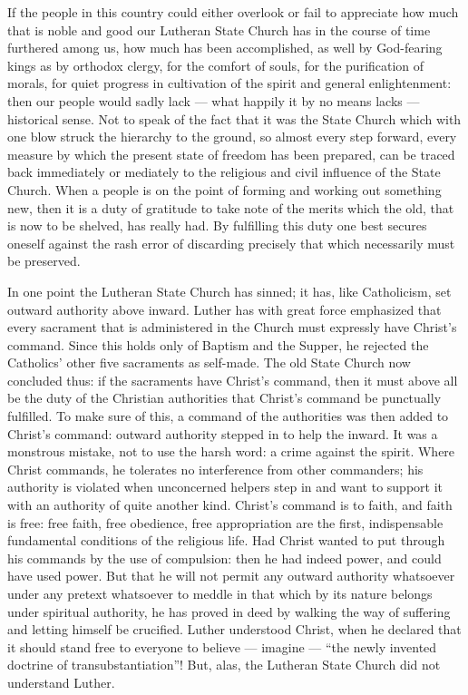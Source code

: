 \documentclass[12pt,a4paper,openany]{book}
\newcommand{\opage}[1]{\marginnote{\footnotesize\textit{[#1]}}}
\begin{document}
If the people in this country could either overlook
or fail to appreciate how much that is noble and good our Lutheran
State Church has in the course of time furthered among us, how
much has been accomplished, as well by God-fearing kings as by orthodox
clergy, for the comfort of souls,
for the purification of morals, for quiet progress in cultivation of the spirit
and general enlightenment: then our people would
sadly lack --- what happily it by no means
lacks --- historical sense. Not to speak of
the fact that it was the State Church which with one blow struck the
\setcounter{footnote}{0}%
\opage{80}hierarchy to the ground, so almost every step
forward, every measure by which the present
state of freedom has been prepared, can be traced back immediately or
mediately to the religious and civil influence of the State Church.
When a people is on the point of forming and working out something new, then it is a
duty of gratitude to take note of the merits
which the old, that is now to be shelved, has really
had. By fulfilling this duty one best secures oneself
against the rash error of discarding precisely that
which necessarily must be preserved.

In one point the Lutheran State Church has sinned;
it has, like Catholicism, set outward
authority above inward. Luther has with great
force emphasized that every sacrament that is administered
in the Church must expressly have Christ's command. Since
this holds only of Baptism and the Supper, he rejected
the Catholics' other five sacraments as self-made.
The old State Church now concluded thus:
if the sacraments have Christ's command, then it must above
all be the duty of the Christian authorities that Christ's
command be punctually fulfilled. To make sure of this,
a command of the authorities was then added to Christ's command:
outward authority stepped in to help
the inward. It was a monstrous mistake, not
to use the harsh word: a crime against the spirit. Where
Christ commands, he tolerates no interference from other
commanders; his authority is violated when unconcerned
helpers step in and want to support it with an
authority of quite another kind. Christ's command is to
faith, and faith is free: free faith, free obedience, free
appropriation are the first, indispensable
\setcounter{footnote}{0}%
\opage{81}fundamental conditions of the religious life. Had Christ wanted to put through his commands
by the use of compulsion: then
he had indeed power, and could have used power. But that
he will not permit any outward authority whatsoever
under any pretext whatsoever to meddle in
that which by its nature belongs under spiritual authority,
he has proved in deed by walking the way of suffering
and letting himself be crucified. Luther understood Christ,
when he declared that it should stand free to everyone
to believe --- imagine --- ``the newly invented doctrine of transubstantiation''! But, alas, the Lutheran State Church
did not understand Luther.
\end{document}
